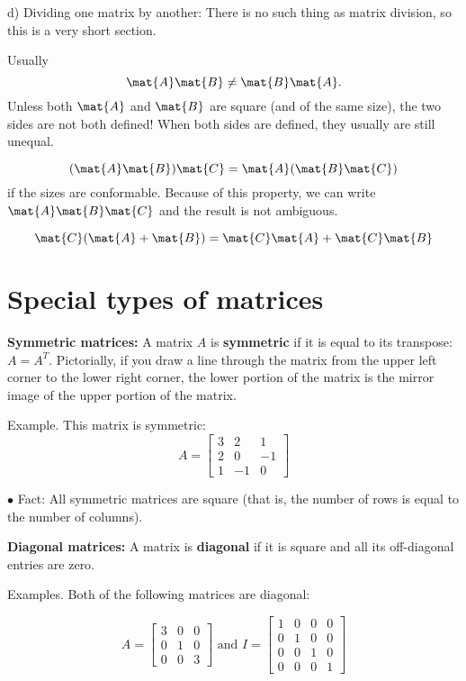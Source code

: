 \documentclass[12pt]{article}
\begin{document}
d) Dividing one matrix by another:  There is no such thing as matrix division, 
so this is a very short section.

Usually
\[
\mat{A}\mat{B} \ne \mat{B}\mat{A}
.
\]
Unless both $\mat{A}$ and $\mat{B}$ are square
(and of the same size), the two sides are not both defined!
When both sides are defined, they usually are still unequal.

\[
(\mat{A} \mat{B}) \mat{C}
= \mat{A} (\mat{B} \mat{C})
\]
if the sizes are conformable.
Because of this property, we can write
$\mat{A}\mat{B}\mat{C}$
and the result is not ambiguous.

\[
\mat{C}(\mat{A} + \mat{B})
= \mat{C}\mat{A} + \mat{C}\mat{B}
\]



\section{Special types of matrices}

{\bf Symmetric matrices:}
A matrix $A$ is {\bf{symmetric}} if it is equal to its transpose: $A = A^T$.
Pictorially, if you draw a line through the matrix from the upper left corner to the
lower right corner, the lower portion of the matrix is the mirror image of the
upper portion of the matrix.

Example. This matrix is symmetric:
$$A = \left[ \begin{array}{ccc}  3 & 2 & 1 \\ 2 & 0 & -1 \\ 1 & -1 & 0 \end{array} \right]$$

$\bullet$ Fact: All symmetric matrices are square (that is, the number of rows is equal
to the number of columns).

{\bf Diagonal matrices:}
A matrix is {\bf{diagonal}} if it is square and all its off-diagonal entries are zero.

Examples. Both of the following matrices are diagonal:

$$A = \left[ \begin{array}{ccc}  3 & 0 & 0 \\ 0 & 1 & 0 \\ 0 & 0 & 3 \end{array} \right]
{\mbox{ and }}
I = \left[ \begin{array}{cccc}  1 & 0 & 0 & 0 \\
 0 & 1 & 0 & 0 \\ 0 & 0 & 1 & 0 \\ 0 & 0 & 0 & 1 \end{array} \right]$$
\end{document}
